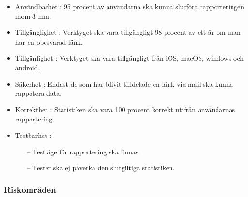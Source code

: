 \documentclass{article}
\begin{document}
\begin{itemize}
    \item  Användbarhet : 95 procent av användarna ska kunna slutföra rapporteringen inom 3 min.
        \item Tillgänglighet : Verktyget ska vara tillgängligt 98 procent av ett år om man har en obesvarad länk.
        \item Tillgänlighet : Verktyget ska vara tillgängligt från iOS, macOS, windows och android. 
    \item Säkerhet : Endast de som har blivit tilldelade en länk via mail ska kunna rappotera data.
    \item Korrekthet : Statistiken ska vara 100 procent korrekt utifrån användarnas rapportering.
    \item Testbarhet :
    \begin{itemize}
        \item [--]Testläge för rapportering ska finnas.
        \item [--]Tester ska ej påverka den slutgiltiga statistiken. 
    \end{itemize}
\end{itemize}

\subsubsection{Riskområden}
\end{document}
